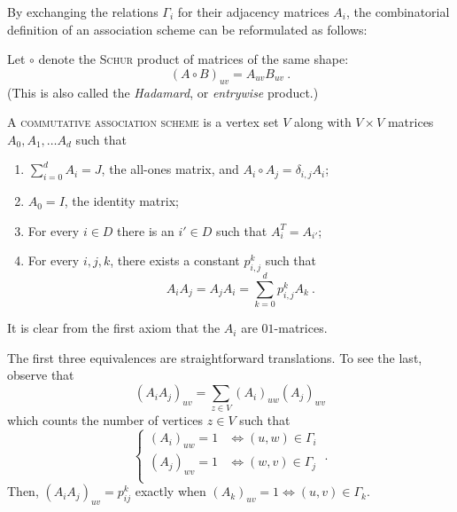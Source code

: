 \documentclass{report}
\begin{document}
    By exchanging the relations $\Gamma_i$ for their adjacency matrices $A_i$, the
    combinatorial definition of an association scheme can be reformulated as
    follows:

    \begin{defn}
      \label{defn:association-scheme-alg}
      Let $\circ$ denote the \textsc{Schur} product of matrices of the same shape:
      \begin{equation}\label{eqn:schur-prod}
        (A \circ B)_{uv} = A_{uv} B_{uv}
        \ .
      \end{equation}
      (This is also called the \textit{Hadamard}, or \textit{entrywise} product.)

      A \textsc{commutative association scheme} is a vertex set $V$ along with
      $V \times V$ matrices $A_0, A_1, \ldots A_d$ such that
      \begin{enumerate}
        \item $\displaystyle \sum_{i=0}^d A_i = J$, the all-ones matrix,
          and $A_i \circ A_j = \delta_{i, j} A_i$;
          \label{ax:aAS-part}
        \item $A_0 = I$, the identity matrix;
          \label{ax:aAS-diag}
        \item For every $i \in D$ there is an $i' \in D$ such that $A_i^T =
          A_{i'}$;
          \label{ax:aAS-sym}
        \item For every $i, j, k$, there exists a constant $p_{i, j}^k$ such
          that
          $$
            A_i A_j = A_j A_i = \sum_{k = 0}^d p_{i, j}^k A_k
            \ .
          $$
          \label{ax:aAS-reg}
      \end{enumerate}
    \end{defn}

    It is clear from the first axiom that the $A_i$ are $01$-matrices.

    The first three equivalences are straightforward translations.  To see the
    last, observe that
    $$
      (A_i A_j)_{uv} = \sum_{z \in V} (A_i)_{uw} (A_j)_{wv}
    $$
    which counts the number of vertices $z \in V$ such that
    $$
      \begin{cases}
        (A_i)_{uw} = 1 & \iff (u, w) \in \Gamma_i \\
        (A_j)_{wv} = 1 & \iff (w, v) \in \Gamma_j \\
      \end{cases}\ .
    $$
    Then, $(A_i A_j)_{uv} = p_{ij}^k$ exactly when $(A_k)_{uv} = 1 \iff (u, v)
    \in \Gamma_k$.
    \\
\end{document}
